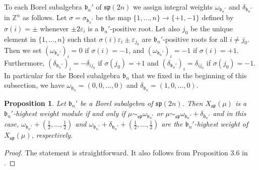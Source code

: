 \documentclass[12pt]{amsart}
\def\gb{\mathfrak{b}}
\newtheorem{prop}[thm]{Proposition}
\begin{document}
To each Borel subalgebra $\gb_n'$  of $\mathfrak{sp} (2n)$ we assign  integral weights $\omega_{\gb_n'}$ and $\delta_{\gb_n'}$ in ${\mathbb Z}^n$  as follows. Let $\sigma = \sigma_{\gb_n'}$ be the map $\{1,...,n\} \to \{+1,-1 \}$ defined by $\sigma (i) = \pm$ whenever $\pm 2 \varepsilon_i$ is a $\gb_n'$-positive root. Let also $j_0$ be the unique element in $ \{1,...,n\} $ such that $\sigma (i) \varepsilon_i \pm \varepsilon_{j_0}$ are $\gb_n'$-positive roots for all $i \neq j_0$. Then we set $(\omega_{\gb_n'})_i = 0$ if $\sigma(i) = -1$, and $(\omega_{\gb_n'})_i  = - 1$ if $\sigma(i) = +1$. Furthermore, $(\delta_{\gb_n'})_{i} = -\delta_{ij_0}$ if $\sigma(j_0) = +1$ and $(\delta_{\gb_n'})_i = \delta_{ij_0}$ if $\sigma(j_0) = -1$. In particular for the Borel subalgebra $\gb_n$ that we fixed in the beginning of this subsection, we have $\omega_{\gb_n} = (0,0,...,0)$ and $\delta_{\gb_n} = (1,0,...,0)$.


\begin{prop} \label{prop-sp2n-hw} Let $\gb_n'$ be a Borel subalgebra of $\mathfrak{sp}({2n})$. Then $X_{\mathfrak{sp}}(\mu)$ is a $\gb_n'$-highest weight module if and only if $\mu \sim_{\mathfrak{sp}} \omega_{\gb_n'}$ or  $\mu \sim_{\mathfrak{sp}} \omega_{\gb_n'} + \delta_{\gb_n'}$ and in this case, $ \omega_{\gb_n'} + \left( \frac{1}{2},..., \frac{1}{2}\right)$ and $ \omega_{\gb_n'} + \delta_{\gb_n'} + \left( \frac{1}{2},..., \frac{1}{2}\right)$ are the $\gb_n'$-highest weight of $X_{\mathfrak{sp}}(\mu)$, respectively. 
\end{prop}
\begin{proof}
The statement  is straightforward. It also follows from Proposition 3.6 in \cite{BBL}. \end{proof}
\end{document}
